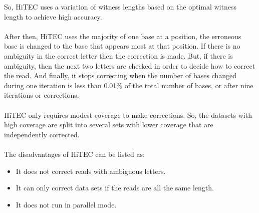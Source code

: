 \documentclass[12pt]{llncs}
\begin{document}
So, HiTEC uses a variation of witness lengths based on the optimal witness length to achieve high accuracy.
\\
\\
After then, HiTEC uses the majority of one base at a position, the erroneous base is changed to the base that appears most at that position. If there is no ambiguity in the correct letter then the correction is made. But, if there is ambiguity, then the next two letters are checked in order to decide how to correct the read. And finally, it stops correcting when the number of bases changed during one iteration is less than 0.01\% of the total number of bases, or after nine iterations or corrections.
\\
\\
HiTEC only requires modest coverage to make corrections. So, the datasets with high coverage are split into several sets with lower coverage that are independently corrected. 
\\
\\
The disadvantages of HiTEC can be listed as:
\begin{itemize}
	\item It does not correct reads with ambiguous letters.
	\item It can only correct data sets if the reads are all the same length.
	\item It does not run in parallel mode.
\end{itemize}
\end{document}

